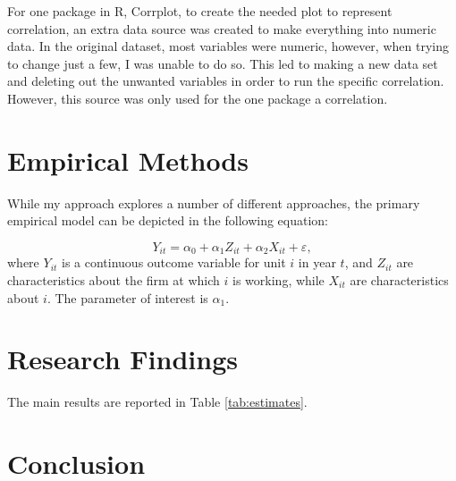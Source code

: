 \documentclass[12pt,english]{article}
\begin{document}
\begin{Data}
\begin{doublespace}
\indent For one package in R, Corrplot, to create the needed plot to represent correlation, an extra data source was created to make everything into numeric data. In the original dataset, most variables were numeric, however, when trying to change just a few, I was unable to do so. This led to making a new data set and deleting out the unwanted variables in order to run the specific correlation. However, this source was only used for the one package a correlation. 

\end{doublespace}
\end{Data}


\section{Empirical Methods}\label{sec:methods}
While my approach explores a number of different approaches, the primary empirical model can be depicted in the following equation:

\begin{equation}
\label{eq:1}
Y_{it}=\alpha_{0} + \alpha_{1}Z_{it} + \alpha_{2} X_{it} + \varepsilon,
\end{equation}
where $Y_{it}$ is a continuous outcome variable for unit $i$ in year $t$, and $Z_{it}$ are characteristics about the firm at which $i$ is working, while $X_{it}$ are characteristics about $i$. The parameter of interest is $\alpha_{1}$.

\lipsum[1-6]

\section{Research Findings}\label{sec:results}
The main results are reported in Table \ref{tab:estimates}.

\lipsum[3-9]

\section{Conclusion}\label{sec:conclusion}
\lipsum[3-4]

\vfill
\pagebreak{}
\begin{spacing}{1.0}


\end{spacing}

\vfill
\pagebreak{}
\clearpage

\end{document}
